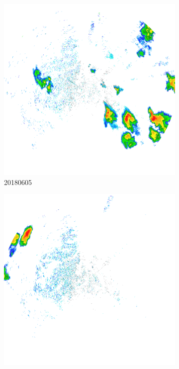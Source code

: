 \begin{figure}[h]
\begin{subfigure}[b]{0.45\textwidth}
		\includegraphics[width=\textwidth]{./thesis_code/plots/midlothian-tx-20180605-104436-ref.png}
		\caption{20180605}
		\label{fig:classifying_datadiscovery_ex3}
	\end{subfigure}
	\begin{subfigure}[b]{0.45\textwidth}
		\includegraphics[width=\textwidth]{./thesis_code/plots/midlothian-tx-20180624-063650-ref.png}

\end{subfigure}
\end{figure}

